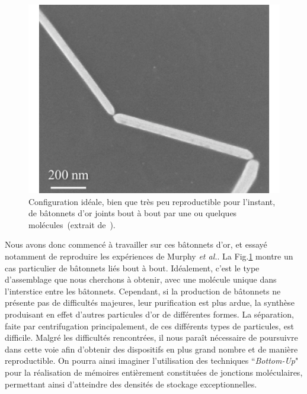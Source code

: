 \begin{figure}[h!]
\parbox{7cm}{
\includegraphics[scale=0.45]{Conclusion/BottomUp/BottomUp.pdf} 
}
\parbox{6.5cm}{\caption{Configuration idéale, bien que très peu reproductible pour l'instant,
de bâtonnets d'or joints bout à bout par une ou quelques molécules~(extrait de~\cite{Liatard2012}).}
\label{BottomUpConclu}
}
\end{figure}

Nous avons donc commencé à travailler sur ces bâtonnets d'or, et essayé notamment de reproduire les expériences de Murphy \textit{et al.}. La Fig.\ref{BottomUpConclu} montre un cas particulier de bâtonnets liés bout à bout. Idéalement, c'est le type d'assemblage que nous cherchons à obtenir, avec une molécule unique dans l'interstice entre les bâtonnets. Cependant, si la production de bâtonnets ne présente pas de difficultés majeures, leur purification est plus ardue, la synthèse produisant en effet d'autres particules d'or de différentes formes. La séparation, faite par centrifugation principalement, de ces différents types de particules, est difficile. Malgré les difficultés rencontrées, il nous paraît nécessaire de poursuivre dans cette voie afin d’obtenir des dispositifs en plus grand nombre et de manière reproductible. On pourra ainsi imaginer l’utilisation des techniques ``\textit{Bottom-Up}" pour la réalisation de mémoires entièrement constituées de jonctions moléculaires, permettant ainsi d’atteindre des densités de stockage exceptionnelles.

